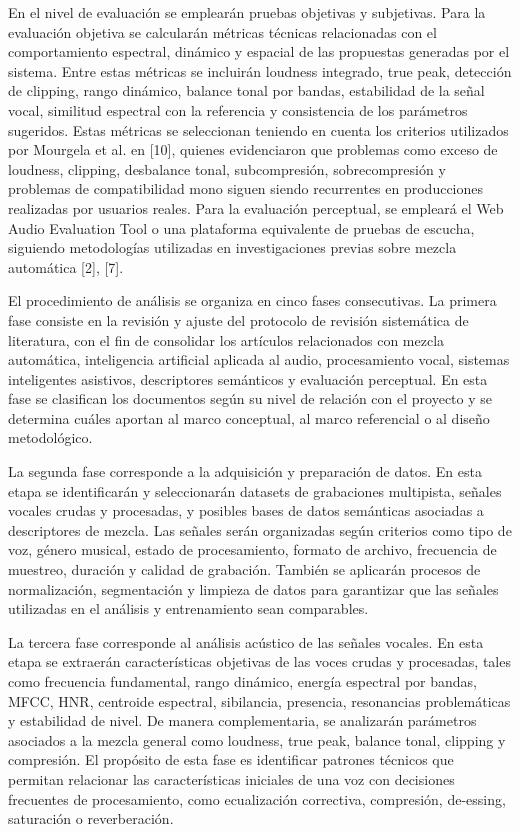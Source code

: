 \documentclass[12pt]{article}
\begin{document}
En el nivel de evaluación se emplearán pruebas objetivas y subjetivas. Para la evaluación objetiva se calcularán métricas técnicas relacionadas con el comportamiento espectral, dinámico y espacial de las propuestas generadas por el sistema. Entre estas métricas se incluirán loudness integrado, true peak, detección de clipping, rango dinámico, balance tonal por bandas, estabilidad de la señal vocal, similitud espectral con la referencia y consistencia de los parámetros sugeridos. Estas métricas se seleccionan teniendo en cuenta los criterios utilizados por Mourgela et al. en [10], quienes evidenciaron que problemas como exceso de loudness, clipping, desbalance tonal, subcompresión, sobrecompresión y problemas de compatibilidad mono siguen siendo recurrentes en producciones realizadas por usuarios reales. Para la evaluación perceptual, se empleará el Web Audio Evaluation Tool o una plataforma equivalente de pruebas de escucha, siguiendo metodologías utilizadas en investigaciones previas sobre mezcla automática [2], [7].

El procedimiento de análisis se organiza en cinco fases consecutivas. La primera fase consiste en la revisión y ajuste del protocolo de revisión sistemática de literatura, con el fin de consolidar los artículos relacionados con mezcla automática, inteligencia artificial aplicada al audio, procesamiento vocal, sistemas inteligentes asistivos, descriptores semánticos y evaluación perceptual. En esta fase se clasifican los documentos según su nivel de relación con el proyecto y se determina cuáles aportan al marco conceptual, al marco referencial o al diseño metodológico.

La segunda fase corresponde a la adquisición y preparación de datos. En esta etapa se identificarán y seleccionarán datasets de grabaciones multipista, señales vocales crudas y procesadas, y posibles bases de datos semánticas asociadas a descriptores de mezcla. Las señales serán organizadas según criterios como tipo de voz, género musical, estado de procesamiento, formato de archivo, frecuencia de muestreo, duración y calidad de grabación. También se aplicarán procesos de normalización, segmentación y limpieza de datos para garantizar que las señales utilizadas en el análisis y entrenamiento sean comparables.

La tercera fase corresponde al análisis acústico de las señales vocales. En esta etapa se extraerán características objetivas de las voces crudas y procesadas, tales como frecuencia fundamental, rango dinámico, energía espectral por bandas, MFCC, HNR, centroide espectral, sibilancia, presencia, resonancias problemáticas y estabilidad de nivel. De manera complementaria, se analizarán parámetros asociados a la mezcla general como loudness, true peak, balance tonal, clipping y compresión. El propósito de esta fase es identificar patrones técnicos que permitan relacionar las características iniciales de una voz con decisiones frecuentes de procesamiento, como ecualización correctiva, compresión, de-essing, saturación o reverberación.
\end{document}
